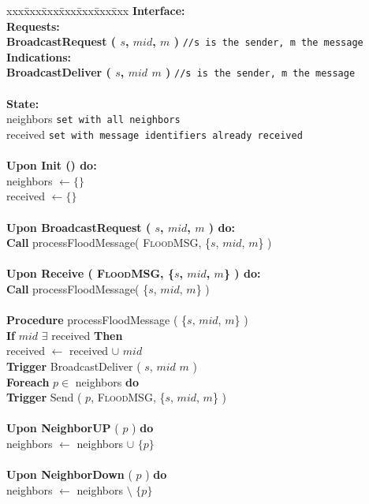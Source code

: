 \documentclass[10pt,a4paper]{article}
\title{\titulo}
\date{\data}
\author{\name\\ \institution}
\begin{document}

\maketitle

\begin{algorithm}[h!]
\label{alg:foreach}
\caption{Flood Broadcast}
\begin{tabbing}
xxx\=xxx\=xxx\=xxx\=xxx\=xxx\=xxx\kill
\textbf{Interface:}\\
\> \textbf{Requests:}\\
\> \> \textbf{BroadcastRequest ( $s$, $mid$, $m$ )} \texttt{//s is the sender, m the message}\\
\> \textbf{Indications:}\\
\> \> \textbf{BroadcastDeliver ( $s$, $mid$ $m$ )} \texttt{//s is the sender, m the message}\\
~\\
\textbf{State:}\\
\> neighbors \texttt{set with all neighbors}\\
\> received \texttt{set with message identifiers already received}\\
~\\
\> \textbf{Upon Init () do:}\\
\> \> neighbors $\longleftarrow \{ \}$\\
\> \> received  $\longleftarrow \{ \}$\\
~\\
\> \textbf{Upon BroadcastRequest ( $s$, $mid$, $m$ ) do:}\\
\> \> \textbf{Call} processFloodMessage( \textsc{FloodMSG}, \{$s$, $mid$, $m$\} )\\
~\\
\> \textbf{Upon Receive ( \textsc{FloodMSG}, \{$s$, $mid$, $m$\} ) do:}\\
\> \> \textbf{Call} processFloodMessage( \{$s$, $mid$, $m$\} )\\
~\\
\> \textbf{Procedure} processFloodMessage ( \{$s$, $mid$, $m$\} )\\
\> \> \textbf{If} $mid$ $\exists$ received \textbf{Then}\\
\> \> \> received $\longleftarrow$ received $\cup$ $mid$\\
\> \> \> \textbf{Trigger} BroadcastDeliver ( $s$, $mid$ $m$ )\\
\> \> \> \textbf{Foreach} $p \in $ neighbors \textbf{do}\\
\> \> \> \> \textbf{Trigger} Send ( $p$, \textsc{FloodMSG}, \{$s$, $mid$, $m$\} )\\
~\\
\> \textbf{Upon NeighborUP} ( $p$ ) \textbf{do}\\
\> \> neighbors $\longleftarrow$ neighbors $\cup$ $\{p\}$\\
~\\
\> \textbf{Upon NeighborDown} ( $p$ ) \textbf{do}\\
\> \> neighbors $\longleftarrow$ neighbors $\setminus$ $\{p\}$\\
~\\
\end{tabbing}
\end{algorithm} 
\end{document}
